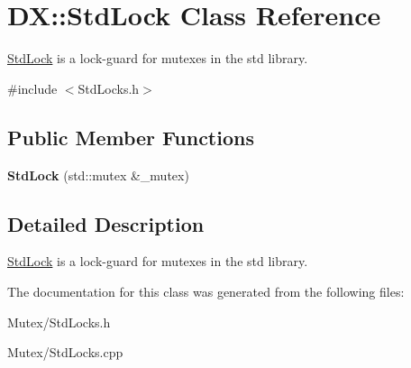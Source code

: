 \hypertarget{class_d_x_1_1_std_lock}{\section{D\-X\-:\-:Std\-Lock Class Reference}
\label{class_d_x_1_1_std_lock}
}


\hyperlink{class_d_x_1_1_std_lock}{Std\-Lock} is a lock-\/guard for mutexes in the std library.  




{\ttfamily \#include $<$Std\-Locks.\-h$>$}

\subsection*{Public Member Functions}
\begin{DoxyCompactItemize}
\item 
\hypertarget{class_d_x_1_1_std_lock_a0c37e2db9c2f36346c615e78509ad206}{{\bfseries Std\-Lock} (std\-::mutex \&\-\_\-mutex)}\label{class_d_x_1_1_std_lock_a0c37e2db9c2f36346c615e78509ad206}

\end{DoxyCompactItemize}


\subsection{Detailed Description}
\hyperlink{class_d_x_1_1_std_lock}{Std\-Lock} is a lock-\/guard for mutexes in the std library. 

The documentation for this class was generated from the following files\-:\begin{DoxyCompactItemize}
\item 
Mutex/Std\-Locks.\-h\item 
Mutex/Std\-Locks.\-cpp\end{DoxyCompactItemize}

